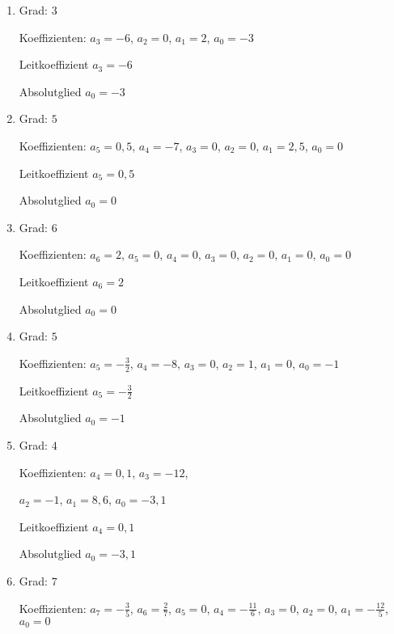 \newpage
\begin{Answer}[ref=ganzHauptA1]

	\begin{minipage}{\textwidth}
		\begin{minipage}[t]{0.49\textwidth}
			\begin{enumerate}[label=\alph*)]
				\item Grad: \(3\)

				Koeffizienten: \(a_3=-6\), \(a_2=0\), \(a_1=2\), \(a_0=-3\)

				Leitkoeffizient \(a_3=-6\)

				Absolutglied \(a_0=-3\)
				\item Grad: \(5\)

				Koeffizienten: \(a_5=0,5\), \(a_4=-7\), \(a_3=0\), \(a_2=0\), \(a_1=2,5\), \(a_0=0\)

				Leitkoeffizient \(a_5=0,5\)

				Absolutglied \(a_0=0\)
				\item
				Grad: \(6\)

				Koeffizienten: \(a_6=2\), \(a_5=0\), \(a_4=0\), \(a_3=0\), \(a_2=0\), \(a_1=0\), \(a_0=0\)

				Leitkoeffizient \(a_6=2\)

				Absolutglied \(a_0=0\)
				\item Grad: \(5\)

				Koeffizienten: \(a_5=-\frac{3}{2}\), \(a_4=-8\), \(a_3=0\), \(a_2=1\), \(a_1=0\), \(a_0=-1\)

				Leitkoeffizient \(a_5=-\frac{3}{2}\)

				Absolutglied \(a_0=-1\)
			\end{enumerate}
		\end{minipage}%
		\begin{minipage}[t]{0.5\textwidth}
			\begin{enumerate}[label=\alph*)]
				\setcounter{enumi}{4}
				\item Grad: \(4\)

				Koeffizienten: \(a_4=0,1\), \(a_3=-12\),

				\(a_2=-1\), \(a_1=8,6\), \(a_0=-3,1\)

				Leitkoeffizient \(a_4=0,1\)

				Absolutglied \(a_0=-3,1\)
				\item Grad: \(7\)

				Koeffizienten: \(a_7=-\frac{3}{5}\), \(a_6=\frac{2}{7}\), \(a_5=0\), \(a_4=-\frac{11}{6}\), \(a_3=0\), \(a_2=0\), \(a_1=-\frac{12}{5}\), \(a_0=0\)


\end{enumerate}
\end{minipage}
\end{minipage}
\end{Answer}
